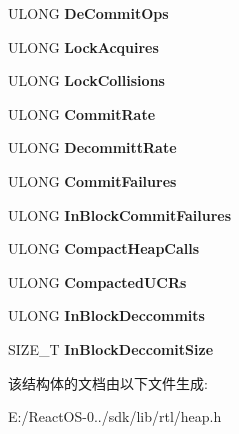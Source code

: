 \begin{DoxyCompactItemize}
U\+L\+O\+NG {\bfseries De\+Commit\+Ops}
\item 
\mbox{\label{struct___h_e_a_p___c_o_u_n_t_e_r_s_a6d0a24342e9ef0afcac58273dbf3893a}} 
U\+L\+O\+NG {\bfseries Lock\+Acquires}
\item 
\mbox{\label{struct___h_e_a_p___c_o_u_n_t_e_r_s_af1a4b20ba8b54fa805e36e9b668986d0}} 
U\+L\+O\+NG {\bfseries Lock\+Collisions}
\item 
\mbox{\label{struct___h_e_a_p___c_o_u_n_t_e_r_s_a72a59c5ccebf0b168181d09f368a68c6}} 
U\+L\+O\+NG {\bfseries Commit\+Rate}
\item 
\mbox{\label{struct___h_e_a_p___c_o_u_n_t_e_r_s_a38ea03cf7f2c5adeed42c2db6cebde00}} 
U\+L\+O\+NG {\bfseries Decommitt\+Rate}
\item 
\mbox{\label{struct___h_e_a_p___c_o_u_n_t_e_r_s_a51fd87dad26b30d2c34aea73d2e16bed}} 
U\+L\+O\+NG {\bfseries Commit\+Failures}
\item 
\mbox{\label{struct___h_e_a_p___c_o_u_n_t_e_r_s_aebb7890d1923e823256a12f8b706de7d}} 
U\+L\+O\+NG {\bfseries In\+Block\+Commit\+Failures}
\item 
\mbox{\label{struct___h_e_a_p___c_o_u_n_t_e_r_s_a13749ae8cf20c8d7b407b9ba01d5e2a9}} 
U\+L\+O\+NG {\bfseries Compact\+Heap\+Calls}
\item 
\mbox{\label{struct___h_e_a_p___c_o_u_n_t_e_r_s_a7b5d7ebddecd360da55d9ade3d601e0a}} 
U\+L\+O\+NG {\bfseries Compacted\+U\+C\+Rs}
\item 
\mbox{\label{struct___h_e_a_p___c_o_u_n_t_e_r_s_a679f67316f85b8124ae5a88ae6ce58a9}} 
U\+L\+O\+NG {\bfseries In\+Block\+Deccommits}
\item 
\mbox{\label{struct___h_e_a_p___c_o_u_n_t_e_r_s_a468f0b3c347e349768662b464613de91}} 
S\+I\+Z\+E\+\_\+T {\bfseries In\+Block\+Deccomit\+Size}
\end{DoxyCompactItemize}


该结构体的文档由以下文件生成\+:\begin{DoxyCompactItemize}
\item 
E\+:/\+React\+O\+S-\/0../sdk/lib/rtl/heap.\+h\end{DoxyCompactItemize}
